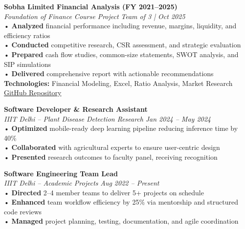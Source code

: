 \documentclass[10pt]{extarticle}
\begin{document}
\begin{contained}
\vspace{10pt}

\textbf{Sobha Limited Financial Analysis (FY 2021–2025)}\\
\textit{Foundation of Finance Course Project}
\hfill \textit{Team of 3 | Oct 2025}\\
\vspace{3pt}
• \textbf{Analyzed} financial performance including revenue, margins, liquidity, and efficiency ratios\\
• \textbf{Conducted} competitive research, CSR assessment, and strategic evaluation\\
• \textbf{Prepared} cash flow studies, common-size statements, SWOT analysis, and SIP simulations\\
• \textbf{Delivered} comprehensive report with actionable recommendations\\
\textbf{Technologies:} Financial Modeling, Excel, Ratio Analysis, Market Research\\
\href{https://github.com/Himanshu8368/FF_project}{GitHub Repository}

\end{contained}

\vspace{8pt}

\begin{contained}
\vspace{5pt}

\textbf{Software Developer \& Research Assistant}\\
\textit{IIIT Delhi – Plant Disease Detection Research}
\hfill \textit{Jan 2024 – May 2024}\\
\vspace{3pt}
• \textbf{Optimized} mobile-ready deep learning pipeline reducing inference time by 40\%\\
• \textbf{Collaborated} with agricultural experts to ensure user-centric design\\
• \textbf{Presented} research outcomes to faculty panel, receiving recognition

\vspace{10pt}

\textbf{Software Engineering Team Lead}\\
\textit{IIIT Delhi – Academic Projects}
\hfill \textit{Aug 2022 – Present}\\
\vspace{3pt}
• \textbf{Directed} 2–4 member teams to deliver 5+ projects on schedule\\
• \textbf{Enhanced} team workflow efficiency by 25\% via mentorship and structured code reviews\\
• \textbf{Managed} project planning, testing, documentation, and agile coordination
\end{contained}
\end{document}
